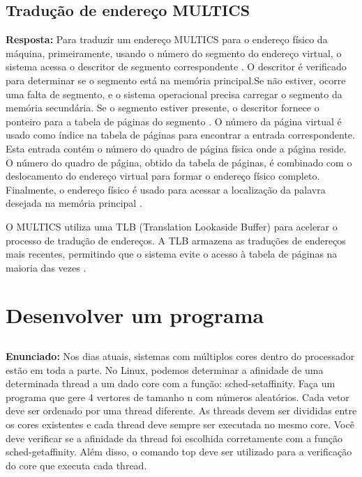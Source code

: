 \documentclass{article}
\begin{document}
\subsection{Tradução de endereço MULTICS}

\textbf{Resposta:} Para traduzir um endereço MULTICS para o endereço físico da máquina, primeiramente, usando o número do segmento do endereço virtual, o sistema acessa o descritor de segmento correspondente \textcite[p. 169]{tanenbaum2021}. O descritor é verificado para determinar se o segmento está na memória principal.Se não estiver, ocorre uma falta de segmento, e o sistema operacional precisa carregar o segmento da memória secundária. Se o segmento estiver presente, o descritor fornece o ponteiro para a tabela de páginas do segmento \textcite[p. 170]{tanenbaum2021}. O número da página virtual é usado como índice na tabela de páginas para encontrar a entrada correspondente. Esta entrada contém o número do quadro de página física onde a página reside.  O número do quadro de página, obtido da tabela de páginas, é combinado com o deslocamento do endereço virtual para formar o endereço físico completo. Finalmente, o endereço físico é usado para acessar a localização da palavra desejada na memória principal \textcite[p. 171]{tanenbaum2021}.

O MULTICS utiliza uma TLB (Translation Lookaside Buffer) para acelerar o processo de tradução de endereços. A TLB armazena as traduções de endereços mais recentes, permitindo que o sistema evite o acesso à tabela de páginas na maioria das vezes \textcite[p. 172]{tanenbaum2021}.


\section{Desenvolver um programa}

\subsection{}
\textbf{Enunciado:} Nos dias atuais, sistemas com múltiplos cores dentro do processador estão em toda a parte. No Linux, podemos determinar a afinidade de uma determinada thread a um dado core com a função: sched-setaffinity. Faça um programa que gere 4 vertores de tamanho n com números aleatórios. Cada vetor deve ser ordenado por uma thread diferente. As threads devem ser divididas entre os cores existentes e cada thread deve sempre ser executada no mesmo core. Você deve verificar se a afinidade da thread foi escolhida corretamente com a função sched-getaffinity. Além disso, o comando top deve ser utilizado para a verificação do core que executa cada thread. \newline
\end{document}
